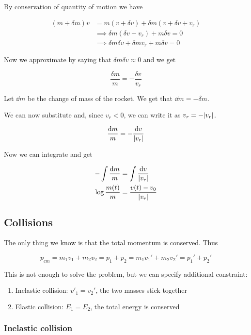 \documentclass[10pt]{extarticle}
\begin{document}
By conservation of quantity of motion we have

\begin{align*}
    (m + \delta m) v & = m (v + \delta v) + \delta m (v + \delta v + v_r)         \\
                     & \implies \delta m (\delta v + v_r) + m \delta v = 0        \\
                     & \implies \delta m \delta v + \delta m v_r + m \delta v = 0
\end{align*}

Now we approximate by saying that $\delta m \delta v \approx 0$ and we get

$$
    \frac{\delta m}{m} = - \frac{\delta v}{v_r}
$$

Let $\dd{m}$ be the change of mass of the rocket. We get that $\dd{m} = - \delta m$.

We can now substitute and, since $v_r < 0$, we can write it as $v_r = - \abs{v_r}$.

$$
    \frac{\dd{m}}{m} = -\frac{\dd{v}}{\abs{v_r}}
$$

Now we can integrate and get

\begin{align*}
    - \int \frac{\dd{m}}{m} & = \int \frac{\dd{v}}{\abs{v_r}} \\
    \log \frac{m(t)}{m}     & = \frac{v(t) - v_0}{\abs{v_r}}
\end{align*}

\subsection{Collisions}

The only thing we know is that the total momentum is conserved. Thus

$$
    p_{cm} = m_1 v_1 + m_2 v_2 = p_1 + p_2 = m_1 v_1' + m_2 v_2' = p_1' + p_2'
$$

This is not enough to solve the problem, but we can specify additional constraint:

\begin{enumerate}[label=\Alph*)]
    \item Inelastic collision: $v'_1 = v_2'$, the two masses stick together
    \item Elastic collision: $E_1 = E_2$, the total energy is conserved
\end{enumerate}

\subsubsection{Inelastic collision}
\end{document}
